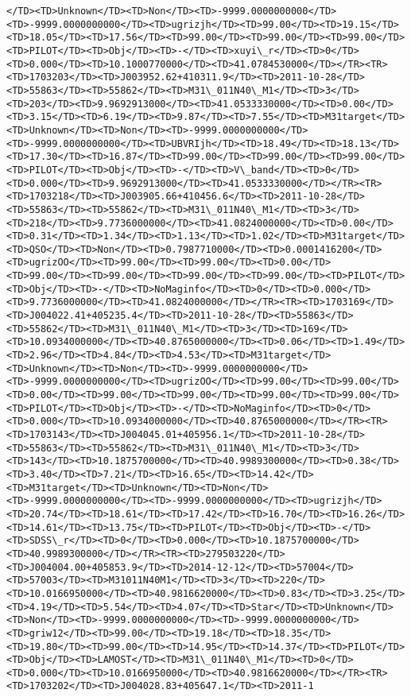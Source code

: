\documentclass[11pt]{article}
\begin{document}
\begin{Verbatim}[commandchars=\\\{\}]
</TD><TD>Unknown</TD><TD>Non</TD><TD>-9999.0000000000</TD><TD>-9999.0000000000</TD><TD>ugrizjh</TD><TD>99.00</TD><TD>19.15</TD><TD>18.05</TD><TD>17.56</TD><TD>99.00</TD><TD>99.00</TD><TD>99.00</TD><TD>PILOT</TD><TD>Obj</TD><TD>-</TD><TD>xuyi\_r</TD><TD>0</TD><TD>0.000</TD><TD>10.1000770000</TD><TD>41.0784530000</TD></TR><TR><TD>1703203</TD><TD>J003952.62+410311.9</TD><TD>2011-10-28</TD><TD>55863</TD><TD>55862</TD><TD>M31\_011N40\_M1</TD><TD>3</TD><TD>203</TD><TD>9.9692913000</TD><TD>41.0533330000</TD><TD>0.00</TD><TD>3.15</TD><TD>6.19</TD><TD>9.87</TD><TD>7.55</TD><TD>M31target</TD><TD>Unknown</TD><TD>Non</TD><TD>-9999.0000000000</TD><TD>-9999.0000000000</TD><TD>UBVRIjh</TD><TD>18.49</TD><TD>18.13</TD><TD>17.30</TD><TD>16.87</TD><TD>99.00</TD><TD>99.00</TD><TD>99.00</TD><TD>PILOT</TD><TD>Obj</TD><TD>-</TD><TD>V\_band</TD><TD>0</TD><TD>0.000</TD><TD>9.9692913000</TD><TD>41.0533330000</TD></TR><TR><TD>1703218</TD><TD>J003905.66+410456.6</TD><TD>2011-10-28</TD><TD>55863</TD><TD>55862</TD><TD>M31\_011N40\_M1</TD><TD>3</TD><TD>218</TD><TD>9.7736000000</TD><TD>41.0824000000</TD><TD>0.00</TD><TD>0.31</TD><TD>1.34</TD><TD>1.13</TD><TD>1.02</TD><TD>M31target</TD><TD>QSO</TD><TD>Non</TD><TD>0.7987710000</TD><TD>0.0001416200</TD><TD>ugrizOO</TD><TD>99.00</TD><TD>99.00</TD><TD>0.00</TD><TD>99.00</TD><TD>99.00</TD><TD>99.00</TD><TD>99.00</TD><TD>PILOT</TD><TD>Obj</TD><TD>-</TD><TD>NoMaginfo</TD><TD>0</TD><TD>0.000</TD><TD>9.7736000000</TD><TD>41.0824000000</TD></TR><TR><TD>1703169</TD><TD>J004022.41+405235.4</TD><TD>2011-10-28</TD><TD>55863</TD><TD>55862</TD><TD>M31\_011N40\_M1</TD><TD>3</TD><TD>169</TD><TD>10.0934000000</TD><TD>40.8765000000</TD><TD>0.06</TD><TD>1.49</TD><TD>2.96</TD><TD>4.84</TD><TD>4.53</TD><TD>M31target</TD><TD>Unknown</TD><TD>Non</TD><TD>-9999.0000000000</TD><TD>-9999.0000000000</TD><TD>ugrizOO</TD><TD>99.00</TD><TD>99.00</TD><TD>0.00</TD><TD>99.00</TD><TD>99.00</TD><TD>99.00</TD><TD>99.00</TD><TD>PILOT</TD><TD>Obj</TD><TD>-</TD><TD>NoMaginfo</TD><TD>0</TD><TD>0.000</TD><TD>10.0934000000</TD><TD>40.8765000000</TD></TR><TR><TD>1703143</TD><TD>J004045.01+405956.1</TD><TD>2011-10-28</TD><TD>55863</TD><TD>55862</TD><TD>M31\_011N40\_M1</TD><TD>3</TD><TD>143</TD><TD>10.1875700000</TD><TD>40.9989300000</TD><TD>0.38</TD><TD>3.40</TD><TD>7.21</TD><TD>16.65</TD><TD>14.42</TD><TD>M31target</TD><TD>Unknown</TD><TD>Non</TD><TD>-9999.0000000000</TD><TD>-9999.0000000000</TD><TD>ugrizjh</TD><TD>20.74</TD><TD>18.61</TD><TD>17.42</TD><TD>16.70</TD><TD>16.26</TD><TD>14.61</TD><TD>13.75</TD><TD>PILOT</TD><TD>Obj</TD><TD>-</TD><TD>SDSS\_r</TD><TD>0</TD><TD>0.000</TD><TD>10.1875700000</TD><TD>40.9989300000</TD></TR><TR><TD>279503220</TD><TD>J004004.00+405853.9</TD><TD>2014-12-12</TD><TD>57004</TD><TD>57003</TD><TD>M31011N40M1</TD><TD>3</TD><TD>220</TD><TD>10.0166950000</TD><TD>40.9816620000</TD><TD>0.83</TD><TD>3.25</TD><TD>4.19</TD><TD>5.54</TD><TD>4.07</TD><TD>Star</TD><TD>Unknown</TD><TD>Non</TD><TD>-9999.0000000000</TD><TD>-9999.0000000000</TD><TD>griw12</TD><TD>99.00</TD><TD>19.18</TD><TD>18.35</TD><TD>19.80</TD><TD>99.00</TD><TD>14.95</TD><TD>14.37</TD><TD>PILOT</TD><TD>Obj</TD><TD>LAMOST</TD><TD>M31\_011N40\_M1</TD><TD>0</TD><TD>0.000</TD><TD>10.0166950000</TD><TD>40.9816620000</TD></TR><TR><TD>1703202</TD><TD>J004028.83+405647.1</TD><TD>2011-1
\end{Verbatim}
\end{document}
